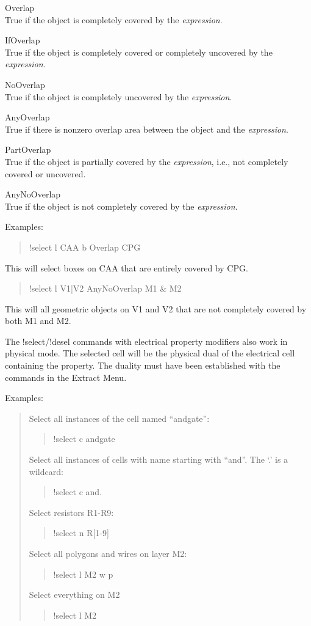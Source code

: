 \begin{description}
\item{\vt Overlap}\\
  True if the object is completely covered by the {\it expression\/}.
\item{\vt IfOverlap}\\
  True if the object is completely covered or completely uncovered
      by the {\it expression\/}.
\item{\vt NoOverlap}\\
  True if the object is completely uncovered by the {\it expression\/}.
\item{\vt AnyOverlap}\\
  True if there is nonzero overlap area between the object and the
  {\it expression\/}.
\item{\vt PartOverlap}\\
  True if the object is partially covered by the {\it expression\/}, i.e.,
  not completely covered or uncovered.
\item{\vt AnyNoOverlap}\\
  True if the object is not completely covered by the {\it expression\/}.
\end{description}
          
Examples:
\begin{quote}
    {\vt !select l CAA b Overlap CPG}
\end{quote}
This will select boxes on CAA that are entirely covered by CPG.

\begin{quote}
    {\vt !select l V1|V2 AnyNoOverlap M1 \& M2}
\end{quote}
This will all geometric objects on V1 and V2 that are not completely
covered by both M1 and M2.

The {\cb !select}/{\cb !desel} commands with electrical property
modifiers also work in physical mode.  The selected cell will be the
physical dual of the electrical cell containing the property.  The
duality must have been established with the commands in the {\cb
Extract Menu}.

Examples:
\begin{quote}
Select all instances of the cell named ``andgate'':
\begin{quote}\vt
!select c andgate
\end{quote}
Select all instances of cells with name starting with ``and''.  The `.' is
a wildcard:
\begin{quote}\vt
!select c and.
\end{quote}
Select resistors R1-R9:
\begin{quote}\vt
!select n R[1-9]
\end{quote}
Select all polygons and wires on layer M2:
\begin{quote}\vt
!select l M2 w p
\end{quote}
Select everything on M2
\begin{quote}\vt
!select l M2
\end{quote}
\end{quote}

